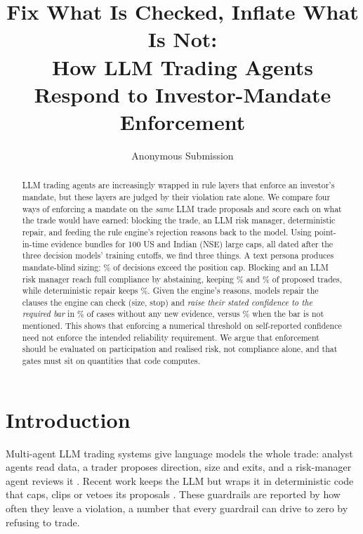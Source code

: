 \documentclass[letterpaper]{article} %
\title{Fix What Is Checked, Inflate What Is Not:\\How LLM Trading Agents Respond to Investor-Mandate Enforcement}
\author{Anonymous Submission}
\begin{document}
\maketitle

\begin{abstract}
LLM trading agents are increasingly wrapped in rule layers that enforce an investor's mandate, but these layers are judged by their violation rate alone. We compare four ways of enforcing a mandate on the \emph{same} LLM trade proposals and score each on what the trade would have earned: blocking the trade, an LLM risk manager, deterministic repair, and feeding the rule engine's rejection reasons back to the model. Using \NBundles{} point-in-time evidence bundles for 100 US and Indian (NSE) large caps, all dated after the three decision models' training cutoffs, we find three things. A text persona produces mandate-blind sizing: \PersonaViol\% of decisions exceed the position cap. Blocking and an LLM risk manager reach full compliance by abstaining, keeping \KeptBlock\% and \KeptAgent\% of proposed trades, while deterministic repair keeps \KeptRepair\%. Given the engine's reasons, models repair the clauses the engine can check (size, stop) and \emph{raise their stated confidence to the required bar} in \ConfRaisedShown\% of cases without any new evidence, versus \ConfRaisedHidden\% when the bar is not mentioned. This shows that enforcing a numerical threshold on self-reported confidence need not enforce the intended reliability requirement. We argue that enforcement should be evaluated on participation and realised risk, not compliance alone, and that gates must sit on quantities that code computes.
\end{abstract}

\section{Introduction}
Multi-agent LLM trading systems give language models the whole trade: analyst agents read data, a trader proposes direction, size and exits, and a risk-manager agent reviews it \citep{xiao2024tradingagents,yu2024fincon,zhang2024finagent}. Recent work keeps the LLM but wraps it in deterministic code that caps, clips or vetoes its proposals \citep{cai2026openpm,kukreja2026biasmix,qu2026clqt}. These guardrails are reported by how often they leave a violation, a number that every guardrail can drive to zero by refusing to trade.
\end{document}
